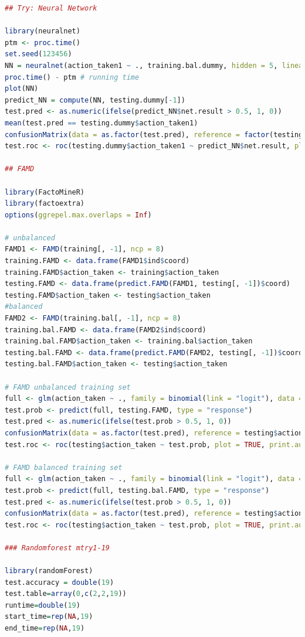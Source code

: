 \documentclass{jpp}
\begin{document}
\begin{lstlisting}[language=R]
## Try: Neural Network

library(neuralnet)
ptm <- proc.time()
set.seed(123456)
NN = neuralnet(action_taken1 ~ ., training.bal.dummy, hidden = 5, linear.output = FALSE, err.fct = 'ce', stepmax = 1e7)
proc.time() - ptm # running time
plot(NN)
predict_NN = compute(NN, testing.dummy[-1])
test.pred <- as.numeric(ifelse(predict_NN$net.result > 0.5, 1, 0))
mean(test.pred == testing.dummy$action_taken1)
confusionMatrix(data = as.factor(test.pred), reference = factor(testing.dummy$action_taken1), positive = "1")
test.roc <- roc(testing.dummy$action_taken1 ~ predict_NN$net.result, plot = TRUE, print.auc = TRUE)

## FAMD

library(FactoMineR)
library(factoextra)
options(ggrepel.max.overlaps = Inf)

# unbalanced
FAMD1 <- FAMD(training[, -1], ncp = 8)
training.FAMD <- data.frame(FAMD1$ind$coord)
training.FAMD$action_taken <- training$action_taken
testing.FAMD <- data.frame(predict.FAMD(FAMD1, testing[, -1])$coord)
testing.FAMD$action_taken <- testing$action_taken
#balanced
FAMD2 <- FAMD(training.bal[, -1], ncp = 8)
training.bal.FAMD <- data.frame(FAMD2$ind$coord)
training.bal.FAMD$action_taken <- training.bal$action_taken
testing.bal.FAMD <- data.frame(predict.FAMD(FAMD2, testing[, -1])$coord)
testing.bal.FAMD$action_taken <- testing$action_taken

# FAMD unbalanced training set
full <- glm(action_taken ~ ., family = binomial(link = "logit"), data = training.FAMD)
test.prob <- predict(full, testing.FAMD, type = "response")
test.pred <- as.numeric(ifelse(test.prob > 0.5, 1, 0))
confusionMatrix(data = as.factor(test.pred), reference = testing$action_taken, positive = "1")
test.roc <- roc(testing$action_taken ~ test.prob, plot = TRUE, print.auc = TRUE)

# FAMD balanced training set
full <- glm(action_taken ~ ., family = binomial(link = "logit"), data = training.bal.FAMD)
test.prob <- predict(full, testing.bal.FAMD, type = "response")
test.pred <- as.numeric(ifelse(test.prob > 0.5, 1, 0))
confusionMatrix(data = as.factor(test.pred), reference = testing$action_taken, positive = "1")
test.roc <- roc(testing$action_taken ~ test.prob, plot = TRUE, print.auc = TRUE)

### Randomforest mtry1-19

library(randomForest)
test.accuracy = double(19)
test.table=array(0,c(2,2,19))
runtime=double(19)
start_time=rep(NA,19)
end_time=rep(NA,19)


\end{lstlisting}
\end{document}
